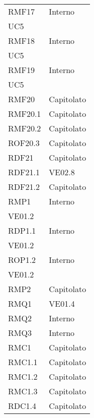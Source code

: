 \begin{longtable}[h!] { >{\centering}m{5cm} >{\centering}m{5cm} }
	\tabularnewline
	RMF17 & Interno\\UC5
	\tabularnewline
	RMF18 & Interno\\UC5
	\tabularnewline
	RMF19 & Interno\\UC5
	\tabularnewline
	RMF20 & Capitolato
	\tabularnewline
	RMF20.1 & Capitolato
	\tabularnewline
	RMF20.2 & Capitolato
	\tabularnewline
	ROF20.3 & Capitolato
	\tabularnewline
	RDF21 & Capitolato
	\tabularnewline
	RDF21.1 & VE02.8
	\tabularnewline
	RDF21.2 & Capitolato
	\tabularnewline
	RMP1 & Interno\\VE01.2
	\tabularnewline
	RDP1.1 & Interno\\VE01.2
	\tabularnewline
	ROP1.2 & Interno\\VE01.2
	\tabularnewline
	RMP2 & Capitolato
	\tabularnewline
	RMQ1 & VE01.4
	\tabularnewline
	RMQ2 & Interno
	\tabularnewline
	RMQ3 & Interno
	\tabularnewline
	RMC1 & Capitolato
	\tabularnewline
	RMC1.1 & Capitolato
	\tabularnewline
	RMC1.2 & Capitolato
	\tabularnewline
	RMC1.3 & Capitolato
	\tabularnewline
	RDC1.4 & Capitolato
	\tabularnewline
	
\end{longtable}

